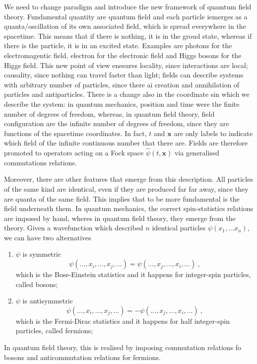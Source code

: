     We need to change paradigm and introduce the new framework of quamtum field theory. Fundamental quantity are quantum field and each particle iemerges as a quanta/oscillation of its own associated field, which is spread everywhere in the spacetime. This means that if there is nothing, it is in the groud state, whereas if there is the particle, it is in an excited state. Examples are photons for the electromagentic field, electron for the electronic field and Higgs bosons for the Higgs field. This new point of view enesures locality, since interactions are local; causality, since nothing can travel faster than light; fields can describe systems with arbitrary number of particles, since there ai creation and annihilation of particles and antiparticles. There is a change also in the coordinate sin which we describe the system: in quantum mechanics, position and time were the finite number of degrees of freedom, whereas, in quantum field theory, field configuration are the infinite number of degrees of freedom, since they are functions of the spacetime coordinates. In fact, $t$ and $\mathbf x$ are only labels to indicate which field of the infinite continuous number that there are. Fields are therefore promoted to operators acting on a Fock space $\hat \psi (t, \mathbf x)$ via generalised commutations relations.

    Moreover, there are other features that emerge from this description. All particles of the same kind are identical, even if they are produced far far away, since they are quanta of the same field. This implies that to be more fundamental is the field underneath them. In quantum mechanics, the correct spin-statistics relations are imposed by hand, wheres in quantum field theory, they emerge from the theory. Given a wavefunction which described $n$ identical particles $\psi(x_1, \ldots x_n)$, we can have two alternatives 
    \begin{enumerate}
        \item $\psi$ is symmetric 
            \begin{equation*}
                \psi(\ldots, x_i, \ldots, x_j, \ldots) = \psi(\ldots, x_j, \ldots, x_i, \ldots) ~,
             \end{equation*}
            which is the Bose-Einstein statistics and it happens for integer-spin particles, called bosons;
        \item $\psi$ is antisymmetric 
            \begin{equation*}
                \psi(\ldots, x_i, \ldots, x_j, \ldots) = - \psi(\ldots, x_j, \ldots, x_i, \ldots) ~,
             \end{equation*}
            which is the Fermi-Dirac statistics and it happens for half integer-spin particles, called fermions;
    \end{enumerate}
    In quantum field theory, this is realised by imposing commutation relations fo bosons and anticommutation relations for fermions.

